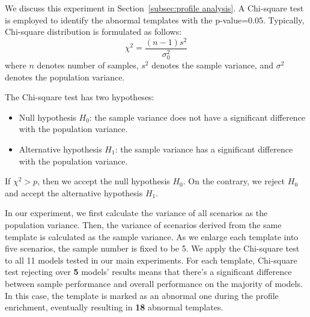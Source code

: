 We discuss this experiment in Section~\ref{subsec:profile analysis}.
A Chi-square test is employed to identify the abnormal templates with the p-value=0.05.
Typically, Chi-square distribution is formulated as follows:
\begin{equation}
    \chi^2=\frac{(n-1) s^2}{\sigma_0^2}
\end{equation}
where \(n\) denotes number of samples, \(s^2\) denotes the sample variance, and \(\sigma^2\) denotes the population variance.

The Chi-square test has two hypotheses:
\begin{itemize}
    \item Null hypothesis \(H_0\): the sample variance does not have a significant difference with the population variance.
    \item Alternative hypothesis \(H_1\): the sample variance has a significant difference with the population variance.
\end{itemize}
If $\chi^2>p$, then we accept the null hypothesis \(H_0\). On the contrary, we reject \(H_0\) and accept the alternative hypothesis \(H_1\).

In our experiment, we first calculate the variance of all scenarios as the population variance.
Then, the variance of scenarios derived from the same template is calculated as the sample variance.
As we enlarge each template into five scenarios, the sample number is fixed to be 5.
We apply the Chi-square test to all 11 models tested in our main experiments.
For each template, Chi-square test rejecting over \textbf{5} models' results means that there's a significant difference between sample performance and overall performance on the majority of models.
In this case, the template is marked as an abnormal one during the profile enrichment, eventually resulting in \textbf{18} abnormal templates.